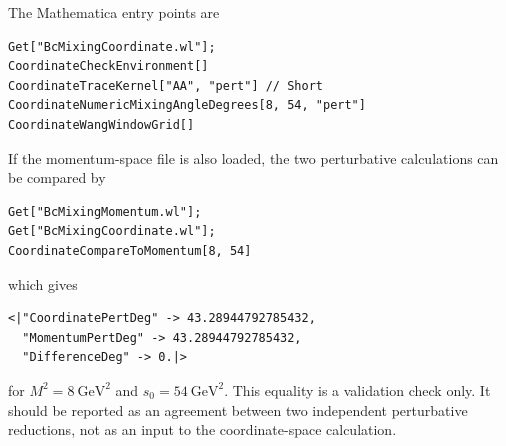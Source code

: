 \documentclass[11pt]{article}
\begin{document}
The Mathematica entry points are
\begin{verbatim}
Get["BcMixingCoordinate.wl"];
CoordinateCheckEnvironment[]
CoordinateTraceKernel["AA", "pert"] // Short
CoordinateNumericMixingAngleDegrees[8, 54, "pert"]
CoordinateWangWindowGrid[]
\end{verbatim}
If the momentum-space file is also loaded, the two perturbative calculations
can be compared by
\begin{verbatim}
Get["BcMixingMomentum.wl"];
Get["BcMixingCoordinate.wl"];
CoordinateCompareToMomentum[8, 54]
\end{verbatim}
which gives
\begin{verbatim}
<|"CoordinatePertDeg" -> 43.28944792785432,
  "MomentumPertDeg" -> 43.28944792785432,
  "DifferenceDeg" -> 0.|>
\end{verbatim}
for \(M^2=8~\mathrm{GeV}^2\) and \(s_0=54~\mathrm{GeV}^2\).
This equality is a validation check only.  It should be reported as an
agreement between two independent perturbative reductions, not as an input to
the coordinate-space calculation.
\end{document}
